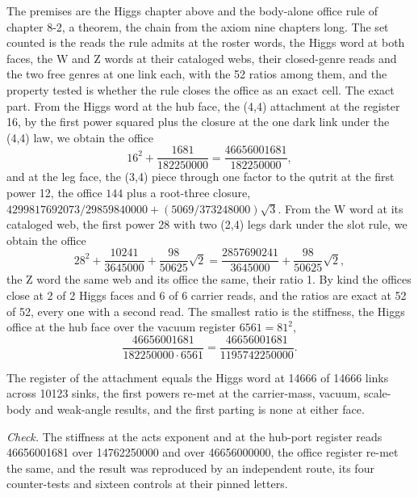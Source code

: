 \begin{chproof}[exact]
The premises are the Higgs chapter above and the body-alone office rule of chapter 8-2, a theorem, the chain from the axiom nine chapters long. The set counted is the reads the rule admits at the roster words, the Higgs word at both faces, the W and Z words at their cataloged webs, their closed-genre reads and the two free genres at one link each, with the 52 ratios among them, and the property tested is whether the rule closes the office as an exact cell. The exact part. From the Higgs word at the hub face, the (4,4) attachment at the register 16, by the first power squared plus the closure at the one dark link under the (4,4) law, we obtain the office
\begin{equation}
16^{2} + \frac{1681}{182250000} = \frac{46656001681}{182250000} ,
\end{equation}
and at the leg face, the (3,4) piece through one factor to the qutrit at the first power 12, the office $144$ plus a root-three closure, $4299817692073/29859840000 + (5069/373248000)\sqrt{3}$. From the W word at its cataloged web, the first power 28 with two (2,4) legs dark under the slot rule, we obtain the office
\begin{equation}
28^{2} + \frac{10241}{3645000} + \frac{98}{50625}\sqrt{2} = \frac{2857690241}{3645000} + \frac{98}{50625}\sqrt{2} ,
\end{equation}
the Z word the same web and its office the same, their ratio 1. By kind the offices close at 2 of 2 Higgs faces and 6 of 6 carrier reads, and the ratios are exact at 52 of 52, every one with a second read. The smallest ratio is the stiffness, the Higgs office at the hub face over the vacuum register $6561 = 81^{2}$,
\begin{equation}
\frac{46656001681}{182250000 \cdot 6561} = \frac{46656001681}{1195742250000} .
\end{equation}
\end{chproof}
\begin{chproof}[census]
The register of the attachment equals the Higgs word at 14666 of 14666 links across 10123 sinks, the first powers re-met at the carrier-mass, vacuum, scale-body and weak-angle results, and the first parting is none at either face.

\emph{Check.} The stiffness at the acts exponent and at the hub-port register reads 46656001681 over 14762250000 and over 46656000000, the office register re-met the same, and the result was reproduced by an independent route, its four counter-tests and sixteen controls at their pinned letters.
\end{chproof}
